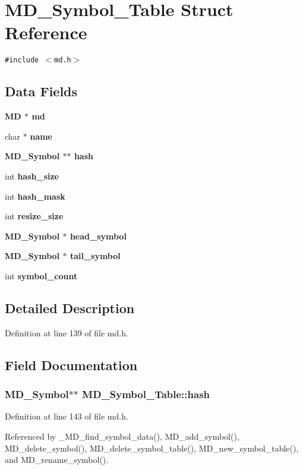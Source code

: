 \section{MD\_\-Symbol\_\-Table Struct Reference}
\label{structMD__Symbol__Table}
{\tt \#include $<$md.h$>$}

\subsection*{Data Fields}
\begin{CompactItemize}
\item 
\bf{MD} $\ast$ \bf{md}
\item 
char $\ast$ \bf{name}
\item 
\bf{MD\_\-Symbol} $\ast$$\ast$ \bf{hash}
\item 
int \bf{hash\_\-size}
\item 
int \bf{hash\_\-mask}
\item 
int \bf{resize\_\-size}
\item 
\bf{MD\_\-Symbol} $\ast$ \bf{head\_\-symbol}
\item 
\bf{MD\_\-Symbol} $\ast$ \bf{tail\_\-symbol}
\item 
int \bf{symbol\_\-count}
\end{CompactItemize}


\subsection{Detailed Description}




Definition at line 139 of file md.h.

\subsection{Field Documentation}
\subsubsection{\setlength{\rightskip}{0pt plus 5cm}\bf{MD\_\-Symbol}$\ast$$\ast$ \bf{MD\_\-Symbol\_\-Table::hash}}\label{structMD__Symbol__Table_84a89b6ff275b96fa93a1b736d16c42c}




Definition at line 143 of file md.h.

Referenced by \_\-MD\_\-find\_\-symbol\_\-data(), MD\_\-add\_\-symbol(), MD\_\-delete\_\-symbol(), MD\_\-delete\_\-symbol\_\-table(), MD\_\-new\_\-symbol\_\-table(), and MD\_\-rename\_\-symbol().
